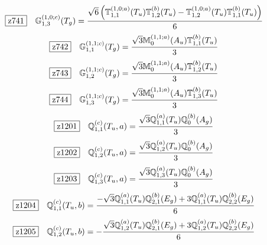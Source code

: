 \documentclass[fleqn,10pt,landscape]{jsarticle}
\begin{document}
\begin{dmath*}
\hspace*{3mm}\fbox{z741}\quad \mathbb{G}_{1,3}^{(1,0;c)}(T_{g})=\frac{\sqrt{6} \left(\mathbb{T}_{1,1}^{(1,0;a)}(T_{u}) \mathbb{T}_{1,2}^{(b)}(T_{u}) - \mathbb{T}_{1,2}^{(1,0;a)}(T_{u}) \mathbb{T}_{1,1}^{(b)}(T_{u})\right)}{6}
\end{dmath*}
\begin{dmath*}
\hspace*{3mm}\fbox{z742}\quad \mathbb{G}_{1,1}^{(1,1;c)}(T_{g})=\frac{\sqrt{3} \mathbb{M}_{0}^{(1,1;a)}(A_{u}) \mathbb{T}_{1,1}^{(b)}(T_{u})}{3}
\end{dmath*}
\begin{dmath*}
\hspace*{3mm}\fbox{z743}\quad \mathbb{G}_{1,2}^{(1,1;c)}(T_{g})=\frac{\sqrt{3} \mathbb{M}_{0}^{(1,1;a)}(A_{u}) \mathbb{T}_{1,2}^{(b)}(T_{u})}{3}
\end{dmath*}
\begin{dmath*}
\hspace*{3mm}\fbox{z744}\quad \mathbb{G}_{1,3}^{(1,1;c)}(T_{g})=\frac{\sqrt{3} \mathbb{M}_{0}^{(1,1;a)}(A_{u}) \mathbb{T}_{1,3}^{(b)}(T_{u})}{3}
\end{dmath*}
\begin{dmath*}
\hspace*{3mm}\fbox{z1201}\quad \mathbb{Q}_{1,1}^{(c)}(T_{u},a)=\frac{\sqrt{3} \mathbb{Q}_{1,1}^{(a)}(T_{u}) \mathbb{Q}_{0}^{(b)}(A_{g})}{3}
\end{dmath*}
\begin{dmath*}
\hspace*{3mm}\fbox{z1202}\quad \mathbb{Q}_{1,2}^{(c)}(T_{u},a)=\frac{\sqrt{3} \mathbb{Q}_{1,2}^{(a)}(T_{u}) \mathbb{Q}_{0}^{(b)}(A_{g})}{3}
\end{dmath*}
\begin{dmath*}
\hspace*{3mm}\fbox{z1203}\quad \mathbb{Q}_{1,3}^{(c)}(T_{u},a)=\frac{\sqrt{3} \mathbb{Q}_{1,3}^{(a)}(T_{u}) \mathbb{Q}_{0}^{(b)}(A_{g})}{3}
\end{dmath*}
\begin{dmath*}
\hspace*{3mm}\fbox{z1204}\quad \mathbb{Q}_{1,1}^{(c)}(T_{u},b)=\frac{- \sqrt{3} \mathbb{Q}_{1,1}^{(a)}(T_{u}) \mathbb{Q}_{2,1}^{(b)}(E_{g}) + 3 \mathbb{Q}_{1,1}^{(a)}(T_{u}) \mathbb{Q}_{2,2}^{(b)}(E_{g})}{6}
\end{dmath*}
\begin{dmath*}
\hspace*{3mm}\fbox{z1205}\quad \mathbb{Q}_{1,2}^{(c)}(T_{u},b)=- \frac{\sqrt{3} \mathbb{Q}_{1,2}^{(a)}(T_{u}) \mathbb{Q}_{2,1}^{(b)}(E_{g}) + 3 \mathbb{Q}_{1,2}^{(a)}(T_{u}) \mathbb{Q}_{2,2}^{(b)}(E_{g})}{6}
\end{dmath*}
\end{document}
